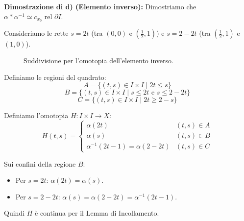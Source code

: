 \vspace{1.5em}

\textbf{Dimostrazione di d) (Elemento inverso):}
Dimostriamo che $\alpha * \alpha^{-1} \simeq c_{x_0} \text{ rel } \partial I$.

Consideriamo le rette $s = 2t$ (tra $(0,0)$ e $(\frac{1}{2},1)$) e $s = 2 - 2t$ (tra $(\frac{1}{2},1)$ e $(1,0)$).

\begin{figure}[H]
    \centering
    \caption{Suddivisione per l'omotopia dell'elemento inverso.}
\end{figure}

Definiamo le regioni del quadrato:
\[
A = \{ (t,s) \in I \times I \mid 2t \leqslant s \}
\]
\[
B = \{ (t,s) \in I \times I \mid s \leqslant 2t \text{ e } s \leqslant 2 - 2t \}
\]
\[
C = \{ (t,s) \in I \times I \mid 2t \geqslant 2 - s \}
\]

Definiamo l'omotopia $H: I \times I \to X$:
\[
H(t,s) = 
\begin{cases}
    \alpha(2t) & (t,s) \in A \\
    \alpha(s) & (t,s) \in B \\
    \alpha^{-1}(2t-1) = \alpha(2 - 2t) & (t,s) \in C
\end{cases}
\]

Sui confini della regione $B$:
\begin{itemize}
    \item Per $s = 2t$: $\alpha(2t) = \alpha(s)$.
    \item Per $s = 2 - 2t$: $\alpha(s) = \alpha(2 - 2t) = \alpha^{-1}(2t - 1)$.
\end{itemize}
Quindi $H$ è continua per il Lemma di Incollamento.

